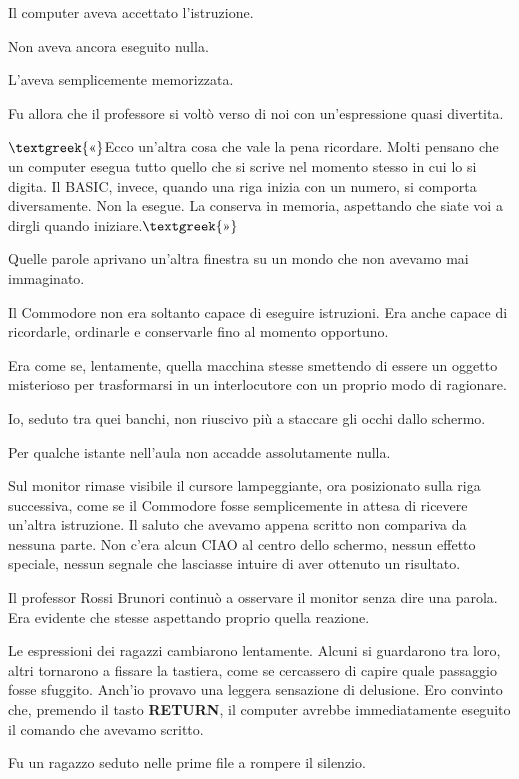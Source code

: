\documentclass{article}
\begin{document}
Il computer aveva accettato l'istruzione.

Non aveva ancora eseguito nulla.

L'aveva semplicemente memorizzata.

Fu allora che il professore si voltò verso di noi con un'espressione quasi divertita.

$\text{\textgreek{«}}$Ecco un'altra cosa che vale la pena ricordare. Molti pensano che un computer esegua tutto quello
che si scrive nel momento stesso in cui lo si digita. Il BASIC, invece, quando una riga inizia con un numero, si
comporta diversamente. Non la esegue. La conserva in memoria, aspettando che siate voi a dirgli quando
iniziare.$\text{\textgreek{»}}$

Quelle parole aprivano un'altra finestra su un mondo che non avevamo mai immaginato.

Il Commodore non era soltanto capace di eseguire istruzioni. Era anche capace di ricordarle, ordinarle e conservarle
fino al momento opportuno.

Era come se, lentamente, quella macchina stesse smettendo di essere un oggetto misterioso per trasformarsi in un
interlocutore con un proprio modo di ragionare.

Io, seduto tra quei banchi, non riuscivo più a staccare gli occhi dallo schermo.

Per qualche istante nell'aula non accadde assolutamente nulla.

Sul monitor rimase visibile il cursore lampeggiante, ora posizionato sulla riga successiva, come se il Commodore fosse
semplicemente in attesa di ricevere un'altra istruzione. Il saluto che avevamo appena scritto non compariva da nessuna
parte. Non c'era alcun {\textquotedbl}CIAO{\textquotedbl} al centro dello schermo, nessun effetto speciale, nessun
segnale che lasciasse intuire di aver ottenuto un risultato.

Il professor Rossi Brunori continuò a osservare il monitor senza dire una parola. Era evidente che stesse aspettando
proprio quella reazione.

Le espressioni dei ragazzi cambiarono lentamente. Alcuni si guardarono tra loro, altri tornarono a fissare la tastiera,
come se cercassero di capire quale passaggio fosse sfuggito. Anch'io provavo una leggera sensazione di delusione. Ero
convinto che, premendo il tasto \textbf{RETURN}, il computer avrebbe immediatamente eseguito il comando che avevamo
scritto.

Fu un ragazzo seduto nelle prime file a rompere il silenzio.
\end{document}
